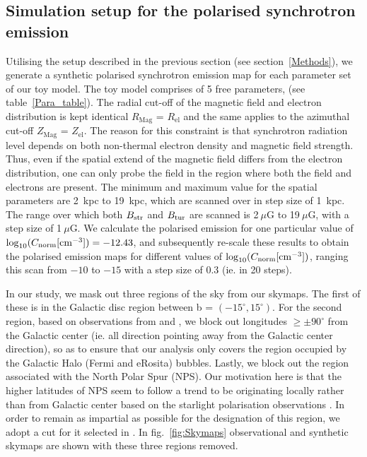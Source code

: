 \documentclass[usenatbib]{mnras}
\begin{document}
\subsection{Simulation setup for the polarised synchrotron emission}
Utilising the setup described in the previous section (see section~\ref{Methods}), we generate a synthetic polarised synchrotron emission map for each parameter set of our toy model. The toy model comprises of 5 free parameters, (see table~\ref{Para_table}). The radial cut-off of the magnetic field and electron distribution is kept identical $R_{\mathrm{Mag}}$ = $R_{\mathrm{el}}$ and the same applies to the azimuthal cut-off $Z_{\mathrm{Mag}}$ = $Z_{\mathrm{el}}$. The reason for this constraint is that synchrotron radiation level depends on both non-thermal electron density and magnetic field strength. Thus, even if the spatial extend of the magnetic field differs from the electron distribution, one can only probe the field in the region where both the field and electrons are present. The minimum and maximum value for the spatial parameters are 2~kpc to 19~kpc, which are scanned over in step size of 1~kpc. The range over which both $B_{\rm str}$ and $B_{\rm tur}$ are scanned is 2$~\mu$G to 19$~\mu$G, with a step size of 1$~\mu$G. We calculate the polarised emission for one particular value of $\log_{10}(C_{\rm norm}[{\rm cm}^{-3}]) = -12.43$, and subsequently re-scale these results to obtain the polarised emission maps for different values of  $\log_{10}(C_{\rm norm} [{\rm cm}^{-3}])$, ranging this scan from $-10$ to $-15$ with a step size of $0.3$ (ie. in 20 steps).%

In our study, we mask out three regions of the sky from our skymaps. The first of these is in the Galactic disc region between b = $(-15^{\circ},15^{\circ})$. For the second region, based on observations from \cite{eROSITA} and \cite{Su_2010}, we block out longitudes  $\geq \pm 90^{\circ}$ from the Galactic center (ie. all direction pointing away from the Galactic center direction), so as to ensure that our analysis only covers the region occupied by the Galactic Halo (Fermi and eRosita) bubbles. Lastly, we block out the region associated with the North Polar Spur (NPS). Our motivation here is that the higher latitudes of NPS seem to follow a trend to be originating locally rather than from Galactic center based on the starlight polarisation observations \cite{Gina_2021}. In order to remain as impartial as possible for the designation of this region, we adopt a cut for it selected in \cite{Wolleben_2007}. In fig.~\ref{fig:Skymaps} observational and synthetic skymaps are shown with these three regions removed.
\end{document}
